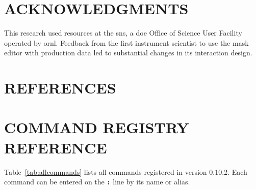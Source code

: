 \documentclass[tm]{ornltm}
\newcommand{\key}[1]{\textbf{\texttt{#1}}}
\begin{document}
\section*{ACKNOWLEDGMENTS}

This research used resources at the \ac{sns}, a \ac{doe} Office of Science User
Facility operated by \ac{ornl}. Feedback from the first instrument scientist to
use the mask editor with production data led to substantial changes in its
interaction design.

\section{REFERENCES}
\printbibliography[heading=none]

\appendix
\acresetall

\section{COMMAND REGISTRY REFERENCE}
\label{sec:appcommands}

Table~\ref{tab:allcommands} lists all commands registered in version 0.10.2.
Each command can be entered on the \key{:} line by its name or alias.
\end{document}
